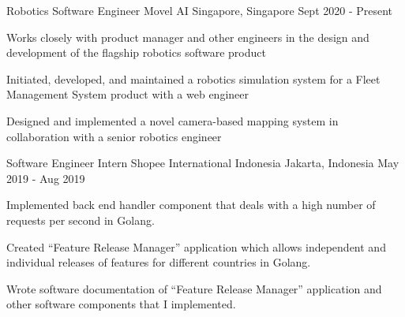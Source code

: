 

\begin{cventries}
\cventry
{Robotics Software Engineer} %
{Movel AI} %
{Singapore, Singapore} %
{Sept 2020 - Present} %
{
	\begin{cvitems} %
		\item {Works closely with product manager and other engineers in the design and development of the flagship robotics software product}
		\item {Initiated, developed, and maintained a robotics simulation system for a Fleet Management System product with a web engineer}
		\item {Designed and implemented a novel camera-based mapping system in collaboration with a senior robotics engineer}
	\end{cvitems}
}

\cventry
{Software Engineer Intern} %
{Shopee International Indonesia} %
{Jakarta, Indonesia} %
{May 2019 - Aug 2019} %
{
	\begin{cvitems} %
		\item {Implemented back end handler component that deals with a high number of requests per second in Golang.}
		\item {Created ``Feature Release Manager'' application which allows independent and individual releases of features for different countries in Golang.}
		\item {Wrote software documentation of ``Feature Release Manager'' application and other software components that I implemented.}
	\end{cvitems}
}



\end{cventries}
